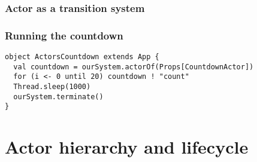 \documentclass[aspectratio=169]{beamer}
\begin{document}
\begin{frame}\frametitle{Actor as a transition system}
  \centering
\end{frame}

\begin{frame}[fragile]\frametitle{Running the countdown}

\begin{lstlisting}[emph={Actor, Logging, Props, ourSystem,terminate,sleep,actorOf,receive,become}]
object ActorsCountdown extends App {
  val countdown = ourSystem.actorOf(Props[CountdownActor])
  for (i <- 0 until 20) countdown ! "count"
  Thread.sleep(1000)
  ourSystem.terminate()
}
\end{lstlisting}


\end{frame}


\section{Actor hierarchy and lifecycle}
\end{document}
